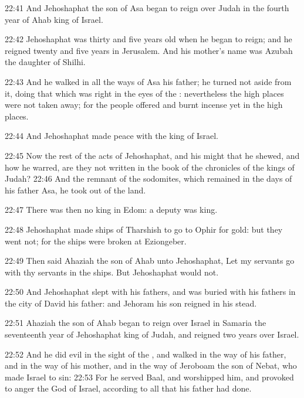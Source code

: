 22:41 And Jehoshaphat the son of Asa began to reign over Judah in the
fourth year of Ahab king of Israel.

22:42 Jehoshaphat was thirty and five years old when he began to
reign; and he reigned twenty and five years in Jerusalem. And his
mother's name was Azubah the daughter of Shilhi.

22:43 And he walked in all the ways of Asa his father; he turned not
aside from it, doing that which was right in the eyes of the \LORD:
nevertheless the high places were not taken away; for the people
offered and burnt incense yet in the high places.

22:44 And Jehoshaphat made peace with the king of Israel.

22:45 Now the rest of the acts of Jehoshaphat, and his might that he
shewed, and how he warred, are they not written in the book of the
chronicles of the kings of Judah?  22:46 And the remnant of the
sodomites, which remained in the days of his father Asa, he took out
of the land.

22:47 There was then no king in Edom: a deputy was king.

22:48 Jehoshaphat made ships of Tharshish to go to Ophir for gold: but
they went not; for the ships were broken at Eziongeber.

22:49 Then said Ahaziah the son of Ahab unto Jehoshaphat, Let my
servants go with thy servants in the ships. But Jehoshaphat would not.

22:50 And Jehoshaphat slept with his fathers, and was buried with his
fathers in the city of David his father: and Jehoram his son reigned
in his stead.

22:51 Ahaziah the son of Ahab began to reign over Israel in Samaria
the seventeenth year of Jehoshaphat king of Judah, and reigned two
years over Israel.

22:52 And he did evil in the sight of the \LORD, and walked in the way
of his father, and in the way of his mother, and in the way of
Jeroboam the son of Nebat, who made Israel to sin: 22:53 For he served
Baal, and worshipped him, and provoked to anger the \LORD God of
Israel, according to all that his father had done.

